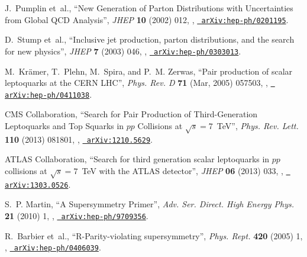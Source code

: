 \documentclass[12pt]{thesis}  %
\begin{document}
\begin{thebibliography}{100}
J.~Pumplin\hrefCMSnoop {} { {et~al.}, ``New Generation of Parton Distributions
  with Uncertainties from Global QCD Analysis'',} \textit{ JHEP} \textbf{ 10}
  (2002) 012,
  \href{http://dx.doi.org/10.1088/1126-6708/2002/07/012}{},
  \href{http://www.arXiv.org/abs/hep-ph/0201195}{\texttt{
  arXiv:hep-ph/0201195}}.

D.~Stump\hrefCMSnoop {} { {et~al.}, ``Inclusive jet production, parton
  distributions, and the search for new physics'',} \textit{ JHEP} \textbf{ 7}
  (2003) 046,
  \href{http://dx.doi.org/10.1088/1126-6708/2003/10/046}{},
  \href{http://www.arXiv.org/abs/hep-ph/0303013}{\texttt{
  arXiv:hep-ph/0303013}}.

\hrefCMSnoop {} {M.~Kr{\"a}mer, T.~Plehn, M.~Spira, and P.~M. Zerwas, ``Pair
  production of scalar leptoquarks at the CERN LHC'',} \textit{ Phys. Rev. D}
  \textbf{ 71} (Mar, 2005) 057503,
  \href{http://dx.doi.org/10.1103/PhysRevD.71.057503}{},
  \href{http://www.arXiv.org/abs/hep-ph/0411038}{\texttt{
  arXiv:hep-ph/0411038}}.

\hrefCMSnoop {} {{CMS Collaboration}, ``Search for Pair Production of
  Third-Generation Leptoquarks and Top Squarks in $pp$ Collisions at
  $\sqrt{s}=7$~TeV'',} \textit{ Phys. Rev. Lett.} \textbf{ 110} (2013) 081801,
  \href{http://dx.doi.org/10.1103/PhysRevLett.110.081801}{},
  \href{http://www.arXiv.org/abs/1210.5629}{\texttt{ arXiv:1210.5629}}.

\hrefCMSnoop {} {{ATLAS Collaboration}, ``Search for third generation scalar
  leptoquarks in $pp$ collisions at $\sqrt{s}=7$~TeV with the ATLAS
  detector'',} \textit{ JHEP} \textbf{ 06} (2013) 033,
  \href{http://dx.doi.org/10.1007/JHEP06(2013)033}{},
  \href{http://www.arXiv.org/abs/1303.0526}{\texttt{ arXiv:1303.0526}}.

\hrefCMSnoop {} {S.~P. Martin, ``{A Supersymmetry Primer}'',} \textit{ Adv.
  Ser. Direct. High Energy Phys.} \textbf{ 21} (2010) 1,
  \href{http://dx.doi.org/10.1142/9789814307505_0001}{},
\href{http://www.arXiv.org/abs/hep-ph/9709356}{\texttt{ arXiv:hep-ph/9709356}}.

R.~Barbier\hrefCMSnoop {} { {et~al.}, ``R-Parity-violating supersymmetry'',}
  \textit{ Phys. Rept.} \textbf{ 420} (2005) 1,
  \href{http://dx.doi.org/10.1016/j.physrep.2005.08.006}{},
  \href{http://www.arXiv.org/abs/hep-ph/0406039}{\texttt{
  arXiv:hep-ph/0406039}}.


\end{thebibliography}
\end{document}

